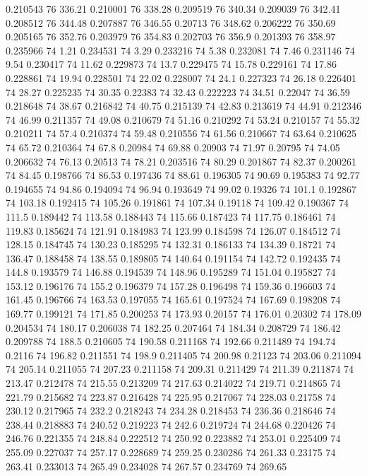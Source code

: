 0.210543 76 336.21
0.210001 76 338.28
0.209519 76 340.34
0.209039 76 342.41
0.208512 76 344.48
0.207887 76 346.55
0.20713 76 348.62
0.206222 76 350.69
0.205165 76 352.76
0.203979 76 354.83
0.202703 76 356.9
0.201393 76 358.97
0.235966 74 1.21
0.234531 74 3.29
0.233216 74 5.38
0.232081 74 7.46
0.231146 74 9.54
0.230417 74 11.62
0.229873 74 13.7
0.229475 74 15.78
0.229161 74 17.86
0.228861 74 19.94
0.228501 74 22.02
0.228007 74 24.1
0.227323 74 26.18
0.226401 74 28.27
0.225235 74 30.35
0.22383 74 32.43
0.222223 74 34.51
0.22047 74 36.59
0.218648 74 38.67
0.216842 74 40.75
0.215139 74 42.83
0.213619 74 44.91
0.212346 74 46.99
0.211357 74 49.08
0.210679 74 51.16
0.210292 74 53.24
0.210157 74 55.32
0.210211 74 57.4
0.210374 74 59.48
0.210556 74 61.56
0.210667 74 63.64
0.210625 74 65.72
0.210364 74 67.8
0.20984 74 69.88
0.20903 74 71.97
0.20795 74 74.05
0.206632 74 76.13
0.20513 74 78.21
0.203516 74 80.29
0.201867 74 82.37
0.200261 74 84.45
0.198766 74 86.53
0.197436 74 88.61
0.196305 74 90.69
0.195383 74 92.77
0.194655 74 94.86
0.194094 74 96.94
0.193649 74 99.02
0.19326 74 101.1
0.192867 74 103.18
0.192415 74 105.26
0.191861 74 107.34
0.19118 74 109.42
0.190367 74 111.5
0.189442 74 113.58
0.188443 74 115.66
0.187423 74 117.75
0.186461 74 119.83
0.185624 74 121.91
0.184983 74 123.99
0.184598 74 126.07
0.184512 74 128.15
0.184745 74 130.23
0.185295 74 132.31
0.186133 74 134.39
0.18721 74 136.47
0.188458 74 138.55
0.189805 74 140.64
0.191154 74 142.72
0.192435 74 144.8
0.193579 74 146.88
0.194539 74 148.96
0.195289 74 151.04
0.195827 74 153.12
0.196176 74 155.2
0.196379 74 157.28
0.196498 74 159.36
0.196603 74 161.45
0.196766 74 163.53
0.197055 74 165.61
0.197524 74 167.69
0.198208 74 169.77
0.199121 74 171.85
0.200253 74 173.93
0.20157 74 176.01
0.20302 74 178.09
0.204534 74 180.17
0.206038 74 182.25
0.207464 74 184.34
0.208729 74 186.42
0.209788 74 188.5
0.210605 74 190.58
0.211168 74 192.66
0.211489 74 194.74
0.2116 74 196.82
0.211551 74 198.9
0.211405 74 200.98
0.21123 74 203.06
0.211094 74 205.14
0.211055 74 207.23
0.211158 74 209.31
0.211429 74 211.39
0.211874 74 213.47
0.212478 74 215.55
0.213209 74 217.63
0.214022 74 219.71
0.214865 74 221.79
0.215682 74 223.87
0.216428 74 225.95
0.217067 74 228.03
0.21758 74 230.12
0.217965 74 232.2
0.218243 74 234.28
0.218453 74 236.36
0.218646 74 238.44
0.218883 74 240.52
0.219223 74 242.6
0.219724 74 244.68
0.220426 74 246.76
0.221355 74 248.84
0.222512 74 250.92
0.223882 74 253.01
0.225409 74 255.09
0.227037 74 257.17
0.228689 74 259.25
0.230286 74 261.33
0.23175 74 263.41
0.233013 74 265.49
0.234028 74 267.57
0.234769 74 269.65
